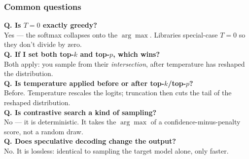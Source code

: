 \documentclass[aspectratio=169]{beamer}
\begin{document}
\begin{frame}
\frametitle{Common questions}

{\small
\textcolor{popblue}{\textbf{Q. Is $T = 0$ exactly greedy?}}\\
Yes --- the softmax collapses onto the $\arg\max$. Libraries special-case $T{=}0$ so they don't divide by zero.\\[6pt]

\textcolor{popblue}{\textbf{Q. If I set both top-$k$ and top-$p$, which wins?}}\\
Both apply: you sample from their \emph{intersection}, after temperature has reshaped the distribution.\\[6pt]

\textcolor{popblue}{\textbf{Q. Is temperature applied before or after top-$k$/top-$p$?}}\\
Before. Temperature rescales the logits; truncation then cuts the tail of the reshaped distribution.\\[6pt]

\textcolor{popblue}{\textbf{Q. Is contrastive search a kind of sampling?}}\\
No --- it is deterministic. It takes the $\arg\max$ of a confidence-minus-penalty score, not a random draw.\\[6pt]

\textcolor{popblue}{\textbf{Q. Does speculative decoding change the output?}}\\
No. It is lossless: identical to sampling the target model alone, only faster.
}
\end{frame}
\end{document}
